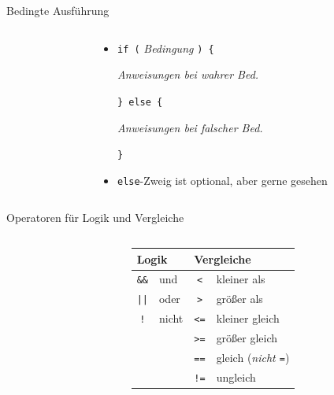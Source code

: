 \documentclass[
  aspectratio=1610,
]{beamer}
\begin{document}
\begin{frame}{Bedingte Ausführung}
  \begin{columns}[T]
    \begin{column}{0.45\textwidth}
      \inputminted[tabsize=4]{c}{bedingung.c}
    \end{column}
    \begin{column}{0.45\textwidth}
      \pause

      \begin{itemize}
        \item \texttt{if (} %
          \textit{Bedingung}
          \texttt{) \{} %

          \quad\textit{Anweisungen bei wahrer Bed.}

          \texttt{\} else \{}

          \quad\textit{Anweisungen bei falscher Bed.}

          \texttt{\}}

        \item \texttt{else}-Zweig ist optional, aber gerne gesehen
      \end{itemize}
    \end{column}
  \end{columns}
\end{frame}

\begin{frame}{Operatoren für Logik und Vergleiche}
  \begin{columns}[T]
    \begin{column}{0.6\textwidth}
      \inputminted[tabsize=4]{c}{logische_operatoren.c}
    \end{column}
    \begin{column}{0.4\textwidth}
      \pause

      \begin{tabular}{clcl}
        \toprule
        \multicolumn{2}{l}{Logik} & \multicolumn{2}{l}{Vergleiche}\\
        \midrule
        \texttt{\&\&} & und   & \texttt{<}  & kleiner als\\
        \texttt{||}   & oder  & \texttt{>}  & größer als\\
        \texttt{!}    & nicht & \texttt{<=} & kleiner gleich\\
                      &       & \texttt{>=} & größer gleich\\
                      &       & \texttt{==} & gleich (\emph{nicht \texttt{=}})\\
                      &       & \texttt{!=} & ungleich\\
      \end{tabular}
    \end{column}
  \end{columns}
\end{frame}
\end{document}
